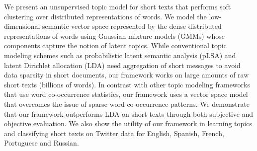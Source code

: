 We present an unsupervised topic model for short texts that performs soft clustering over distributed representations of words. We model the low-dimensional semantic vector space represented by the dense distributed representations of words using Gaussian mixture models (GMMs) whose components capture the notion of latent topics. While conventional topic modeling schemes such as probabilistic latent semantic analysis (pLSA) and latent Dirichlet allocation (LDA) need aggregation of short messages to avoid data sparsity in short documents, our framework works on large amounts of raw short texts (billions of words). In contrast with other topic modeling frameworks that use word co-occurrence statistics, our framework uses a vector space model that overcomes the issue of sparse word co-occurrence patterns. We demonstrate that our framework outperforms LDA on short texts through both subjective and objective evaluation. We also show the utility of our framework in learning topics and classifying short texts on Twitter data for English, Spanish, French, Portuguese and Russian.
